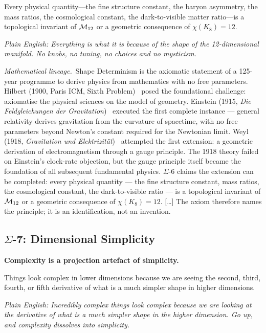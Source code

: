 Every physical quantity---the fine structure constant, the baryon asymmetry, the mass ratios, the cosmological constant, the dark-to-visible matter ratio---is a topological invariant of $\mathcal{M}_{12}$ or a geometric consequence of $\chi(K_8) = 12$.

\emph{Plain English: Everything is what it is because of the shape of the 12-dimensional manifold.  No knobs, no tuning, no choices and no mysticism.}

\smallskip

\noindent\emph{Mathematical lineage.}\ Shape Determinism is the axiomatic statement of a 125-year programme to derive physics from mathematics with no free parameters.  Hilbert (1900, Paris ICM, Sixth Problem)~\cite{Hilbert1900} posed the foundational challenge: axiomatise the physical sciences on the model of geometry.  Einstein (1915, \emph{Die Feldgleichungen der Gravitation})~\cite{Einstein1915} executed the first complete instance --- general relativity derives gravitation from the curvature of spacetime, with no free parameters beyond Newton's constant required for the Newtonian limit.  Weyl (1918, \emph{Gravitation und Elektrizit\"{a}t})~\cite{Weyl1918} attempted the first extension: a geometric derivation of electromagnetism through a gauge principle.  The 1918 theory failed on Einstein's clock-rate objection, but the gauge principle itself became the foundation of all subsequent fundamental physics.  $\Sigma$-6 claims the extension can be completed: every physical quantity --- the fine structure constant, mass ratios, the cosmological constant, the dark-to-visible ratio --- is a topological invariant of $\mathcal{M}_{12}$ or a geometric consequence of $\chi(K_8) = 12$. [\ldots]  The axiom therefore names the principle; it is an identification, not an invention.

\subsection*{$\Sigma$-7: Dimensional Simplicity}
\par\smallskip
\textbf{Complexity is a projection artefact of simplicity.}

Things look complex in lower dimensions because we are seeing the second, third, fourth, or fifth derivative of what is a much simpler shape in higher dimensions.

\emph{Plain English: Incredibly complex things look complex because we are looking at the derivative of what is a much simpler shape in the higher dimension.  Go up, and complexity dissolves into simplicity.}


